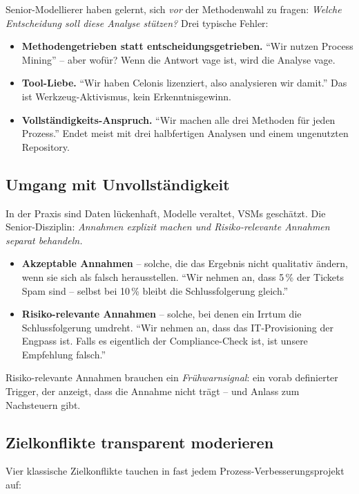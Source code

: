 \documentclass[11pt,a4paper,oneside]{article}
\begin{document}
Senior-Modellierer haben gelernt, sich \emph{vor} der Methodenwahl zu fragen: \emph{Welche Entscheidung soll diese Analyse stützen?} Drei typische Fehler:

\begin{itemize}
  \item \textbf{Methodengetrieben statt entscheidungsgetrieben.} ``Wir nutzen Process Mining'' -- aber wofür? Wenn die Antwort vage ist, wird die Analyse vage.
  \item \textbf{Tool-Liebe.} ``Wir haben Celonis lizenziert, also analysieren wir damit.'' Das ist Werkzeug-Aktivismus, kein Erkenntnisgewinn.
  \item \textbf{Vollständigkeits-Anspruch.} ``Wir machen alle drei Methoden für jeden Prozess.'' Endet meist mit drei halbfertigen Analysen und einem ungenutzten Repository.
\end{itemize}

\subsection{Umgang mit Unvollständigkeit}

In der Praxis sind Daten lückenhaft, Modelle veraltet, VSMs geschätzt. Die Senior-Disziplin: \emph{Annahmen explizit machen und Risiko-relevante Annahmen separat behandeln.}

\begin{itemize}
  \item \textbf{Akzeptable Annahmen} -- solche, die das Ergebnis nicht qualitativ ändern, wenn sie sich als falsch herausstellen. ``Wir nehmen an, dass 5\,\% der Tickets Spam sind -- selbst bei 10\,\% bleibt die Schlussfolgerung gleich.''
  \item \textbf{Risiko-relevante Annahmen} -- solche, bei denen ein Irrtum die Schlussfolgerung umdreht. ``Wir nehmen an, dass das IT-Provisioning der Engpass ist. Falls es eigentlich der Compliance-Check ist, ist unsere Empfehlung falsch.''
\end{itemize}

Risiko-relevante Annahmen brauchen ein \emph{Frühwarnsignal}: ein vorab definierter Trigger, der anzeigt, dass die Annahme nicht trägt -- und Anlass zum Nachsteuern gibt.

\subsection{Zielkonflikte transparent moderieren}

Vier klassische Zielkonflikte tauchen in fast jedem Prozess-Verbesserungsprojekt auf:
\end{document}
